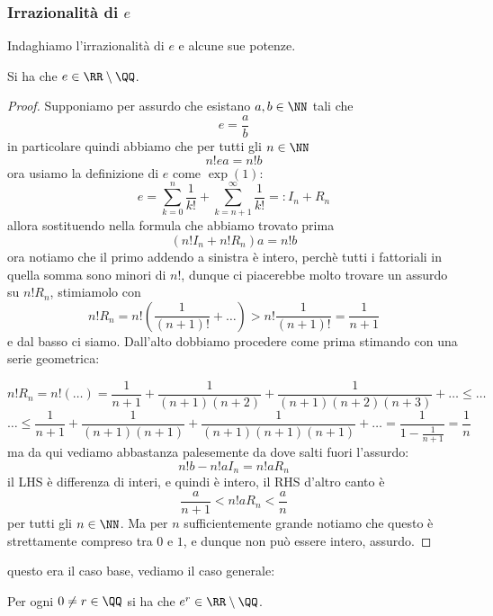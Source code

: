 \documentclass[11pt]{scrartcl}
\begin{document}
	 \subsubsection{Irrazionalità di $e$}
	 Indaghiamo l'irrazionalità di $e$ e alcune sue potenze.
	 \begin{proposition}[Irrazionalità di $e$]
	 	Si ha che $e\in \RR\setminus\QQ$.
	 \end{proposition}
	 \begin{proof}
	 	Supponiamo per assurdo che esistano $a,b\in\NN$ tali che
	 	$$e=\frac{a}{b}$$
	 	in particolare quindi abbiamo che per tutti gli $n\in\NN$
	 	$$n!ea=n!b$$
	 	ora usiamo la definizione di $e$ come $\exp(1)$:
	 	$$e=\sum_{k=0}^{n}\frac{1}{k!}+\sum_{k=n+1}^\infty \frac{1}{k!}=:I_n+R_n$$
	 	allora sostituendo nella formula che abbiamo trovato prima
	 	$$(n!I_n+n!R_n)a=n!b$$
	 	ora notiamo che il primo addendo a sinistra è intero, perchè tutti i fattoriali in quella somma sono minori di $n!$, dunque ci piacerebbe molto trovare un assurdo su $n!R_n$, stimiamolo con
	 	$$n!R_n=n!\left(\frac{1}{(n+1)!}+\dots\right)>n!\frac{1}{(n+1)!}=\frac{1}{n+1}$$
	 	e dal basso ci siamo. Dall'alto dobbiamo procedere come prima stimando con una serie geometrica:
	 	
	 	$$n!R_n=n!\left(\dots\right)=\frac{1}{n+1}+\frac{1}{(n+1)(n+2)}+\frac{1}{(n+1)(n+2)(n+3)}+\dots\le \dots$$
	 	$$\dots \le \frac{1}{n+1}+\frac{1}{(n+1)(n+1)}+\frac{1}{(n+1)(n+1)(n+1)}+\dots=\frac{1}{1-\frac{1}{n+1}}=\frac{1}{n}$$
	 	ma da qui vediamo abbastanza palesemente da dove salti fuori l'assurdo:
	 	$$n!b-n!aI_n=n!aR_n$$
	 	il LHS è differenza di interi, e quindi è intero, il RHS d'altro canto è
	 	$$\frac{a}{n+1}<n!aR_n<\frac{a}{n}$$
	 	per tutti gli $n\in\NN$. Ma per $n$ sufficientemente grande notiamo che questo è strettamente compreso tra $0$ e $1$, e dunque non può essere intero, assurdo. 
	 \end{proof}
	 questo era il caso base, vediamo il caso generale:
	 \begin{theorem}
	 	Per ogni $0\ne r\in\QQ$ si ha che $e^r\in\RR\setminus\QQ$.
	 \end{theorem}
\end{document}
